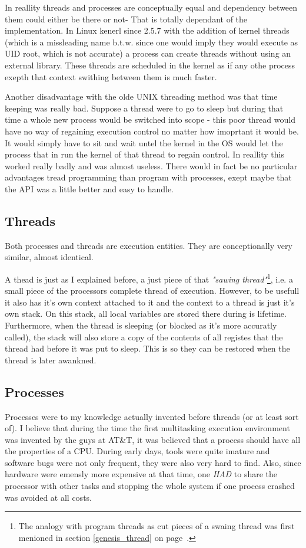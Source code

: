 		In reallity threads and processes are conceptually equal and dependency between them could either be there or not- That is totally dependant of the implementation. In Linux kenerl since 2.5.7 with the addition of kernel threads (which is a missleading name b.t.w. since one would imply they would execute as UID root, which is not accurate) a process can create threads without using an external library. These threads are scheduled in the kernel as if any othe process exepth that context swithing between them is much faster.

		Another disadvantage with the olde UNIX threading method was that time keeping was really bad. Suppose a thread were to go to sleep but during that time a whole new process would be switched into scope - this poor thread would have no way of regaining execution control no matter how imoprtant it would be. It would simply have to sit and wait untel the kernel in the OS would let the process that in run the kernel of that thread to regain control. In reallity this worked really badly and was almost useless. There would in fact be no particular advantages tread programming than program with processes, exept maybe that the API was a little better and easy to handle.



		\subsection{Threads}
			Both processes and threads are execution entities. They are conceptionally very similar, almost identical.

			A thead is just as I explained before, a just piece of that \textit{"sawing thread"}\footnote{The analogy with program threads as cut pieces of a swaing thread was first menioned in section \ref{genesis_thread} on page~\pageref{genesis_thread}.}, i.e. a small piece of the processors complete thread of execution. However, to be usefull it also has it's own context attached to it and the context to a thread is just it's own stack. On this stack, all local variables are stored there during is lifetime. Furthermore, when the thread is sleeping (or blocked as it's more accuratly called), the stack will also store a copy of the contents of all registes that the thread had before it was put to sleep. This is so they can be restored when the thread is later awankned.

		\subsection{Processes}
			Processes were to my knowledge actually invented before threads (or at least sort of).
			I believe that during the time the first multitasking execution environment was invented by the guys at AT\&T, it was believed that a process should have all the properties of a CPU. During early days, tools were quite imature and software bugs were not only frequent, they were also very hard to find. Also, since hardware were emensly more expensive at that time, one \textit{HAD} to share the processor with other tasks and stopping the whole system if one process crashed was avoided at all costs. 

